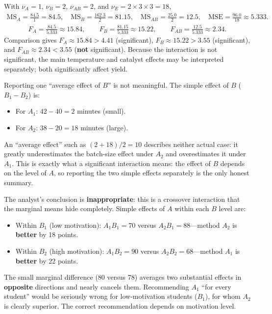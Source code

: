 \begin{solproblema}[prob:414074b]
With $\nu_A=1$, $\nu_B=2$, $\nu_{AB}=2$, and $\nu_E=2\times3\times3=18$,
\begin{align}
\text{MS}_A=\frac{84.5}{1}=84.5,\quad \text{MS}_B=\frac{162.3}{2}=81.15,\quad \text{MS}_{AB}=\frac{25.0}{2}=12.5,\quad \text{MSE}=\frac{96.0}{18}\approx5.333.
\end{align}
\begin{align}
F_A=\frac{84.5}{5.333}\approx15.84,\qquad F_B=\frac{81.15}{5.333}\approx15.22,\qquad F_{AB}=\frac{12.5}{5.333}\approx2.34.
\end{align}
Comparison gives $F_A\approx15.84>4.41$ (significant), $F_B\approx15.22>3.55$ (significant), and $F_{AB}\approx2.34<3.55$ (\textbf{not} significant). Because the interaction is not significant, the main temperature and catalyst effects may be interpreted separately; both significantly affect yield.
\end{solproblema}

\begin{solproblema}[prob:64cf64c]
Reporting one ``average effect of $B$'' is not meaningful. The simple effect of $B$ ($B_1-B_2$) is:
\begin{itemize}
\item For $A_1$: $42-40=2$ minutes (small).
\item For $A_2$: $38-20=18$ minutes (large).
\end{itemize}
An ``average effect'' such as $(2+18)/2=10$ describes neither actual case: it greatly underestimates the batch-size effect under $A_2$ and overestimates it under $A_1$. This is exactly what a significant interaction means: the effect of $B$ depends on the level of $A$, so reporting the two simple effects separately is the only honest summary.
\end{solproblema}

\begin{solproblema}
The analyst's conclusion is \textbf{inappropriate}: this is a crossover interaction that the marginal means hide completely. Simple effects of $A$ within each $B$ level are:
\begin{itemize}
\item Within $B_1$ (low motivation): $A_1B_1=70$ versus $A_2B_1=88$—method $A_2$ is \textbf{better} by 18 points.
\item Within $B_2$ (high motivation): $A_1B_2=90$ versus $A_2B_2=68$—method $A_1$ is \textbf{better} by 22 points.
\end{itemize}
The small marginal difference (80 versus 78) averages two substantial effects in \textbf{opposite} directions and nearly cancels them. Recommending $A_1$ ``for every student'' would be seriously wrong for low-motivation students ($B_1$), for whom $A_2$ is clearly superior. The correct recommendation depends on motivation level.
\end{solproblema}

